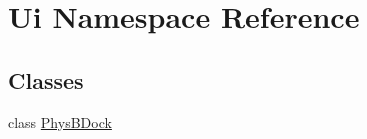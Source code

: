 \hypertarget{namespace_ui}{\section{Ui Namespace Reference}
\label{namespace_ui}
}
\subsection*{Classes}
\begin{DoxyCompactItemize}
\item 
class \hyperlink{class_ui_1_1_phys_b_dock}{Phys\-B\-Dock}
\end{DoxyCompactItemize}

